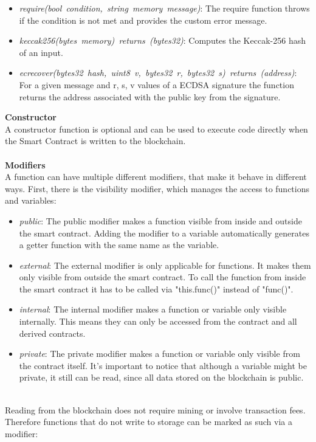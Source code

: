 \begin{itemize}
  \item \textit{require(bool condition, string memory message)}: The require function throws if the condition is not met and provides the custom error message.
  \item \textit{keccak256(bytes memory) returns (bytes32)}: Computes the Keccak-256 hash of an input.
  \item \textit{ecrecover(bytes32 hash, uint8 v, bytes32 r, bytes32 s) returns (address)}: For a given message and r, s, v values of a ECDSA signature the function returns the address associated with the public key from the signature.
\end{itemize}
\leavevmode
\textbf{Constructor}\\
A constructor function is optional and can be used to execute code directly when the Smart Contract is written to the blockchain\cite{doc-constructor}.
\\\\
\textbf{Modifiers}\\
A function can have multiple different modifiers, that make it behave in different ways\cite{doc-modifiers}.
First, there is the visibility modifier, which manages the access to functions and variables:
\begin{itemize}
  \item \textit{public}: The public modifier makes a function visible from inside and outside the smart contract. Adding the modifier to a variable automatically generates a getter function with the same name as the variable.
  \item \textit{external}: The external modifier is only applicable for functions. It makes them only visible from outside the smart contract. To call the function from inside the smart contract it has to be called via "this.func()" instead of "func()".
  \item \textit{internal}: The internal modifier makes a function or variable only visible internally. This means they can only be accessed from the contract and all derived contracts.
  \item \textit{private}: The private modifier makes a function or variable only visible from the contract itself. It’s important to notice that although a variable might be private, it still can be read, since all data stored on the blockchain is public.
\end{itemize} 
\leavevmode
\\
Reading from the blockchain does not require mining or involve transaction fees. Therefore functions that do not write to storage can be marked as such via a modifier:
